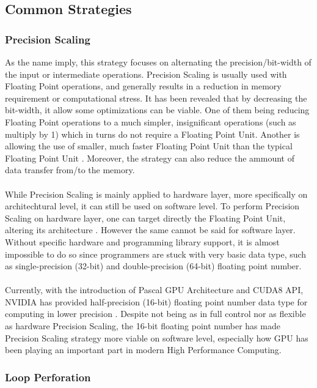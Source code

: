 \subsection{Common Strategies}

\subsubsection{Precision Scaling}

As the name imply, this strategy focuses on alternating the precision/bit-width of the input or intermediate operations. Precision Scaling is usually used with Floating Point operations, and generally results in a reduction in memory requirement or computational stress. It has been revealed that by decreasing the bit-width, it allow some optimizations can be viable. One of them being reducing Floating Point operations to a much simpler, insignificant operations (such as multiply by 1) which in turns do not require a Floating Point Unit. Another is allowing the use of smaller, much faster Floating Point Unit than the typical Floating Point Unit \cite{4408271}. Moreover, the strategy can also reduce the ammount of data transfer from/to the memory. \\
~\\
While Precision Scaling is mainly applied to hardware layer, more specifically on architechtural level, it can still be used on software level. To perform Precision Scaling on hardware layer, one can target directly the Floating Point Unit, altering its architecture \cite{AxCSurvey}. However the same cannot be said for software layer. Without specific hardware and programming library support, it is almost impossible to do so since programmers are stuck with very basic data type, such as single-precision (32-bit) and double-precision (64-bit) floating point number. \\
~\\
Currently, with the introduction of Pascal GPU Architecture and CUDA8 API, NVIDIA has provided half-precision (16-bit) floating point number data type for computing in lower precision \cite{CUDA8}. Despite not being as in full control nor as flexible as hardware Precision Scaling, the 16-bit floating point number has made Precision Scaling strategy more viable on software level, especially how GPU has been playing an important part in modern High Performance Computing. \\

\subsubsection{Loop Perforation}

